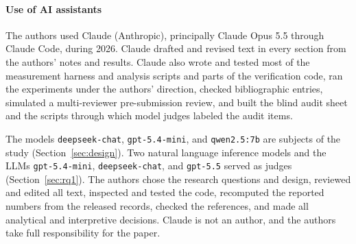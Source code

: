 \paragraph{Use of AI assistants}
The authors used Claude (Anthropic), principally Claude Opus 5.5 through Claude
Code, during 2026. Claude drafted and revised text in every section from the
authors' notes and results. Claude also wrote and tested most of the measurement
harness and analysis scripts and parts of the verification code, ran the
experiments under the authors' direction, checked bibliographic entries,
simulated a multi-reviewer pre-submission review, and built the blind audit sheet
and the scripts through which model judges labeled the audit items.

The models \texttt{deepseek-chat}, \texttt{gpt-5.4-mini}, and
\texttt{qwen2.5:7b} are subjects of the study (Section~\ref{sec:design}). Two
natural language inference models and the LLMs \texttt{gpt-5.4-mini},
\texttt{deepseek-chat}, and \texttt{gpt-5.5} served as judges
(Section~\ref{sec:rq1}). The authors chose the research questions and design,
reviewed and edited all text, inspected and tested the code, recomputed the
reported numbers from the released records, checked the references, and made all
analytical and interpretive decisions. Claude is not an author, and the authors
take full responsibility for the paper.
